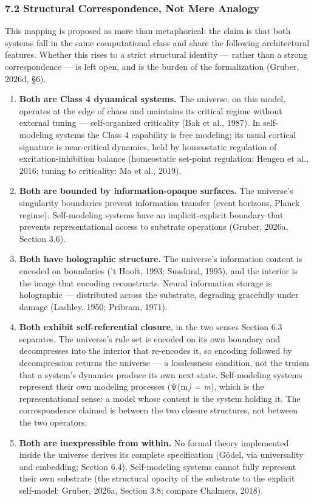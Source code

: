 \documentclass[
]{article}
\begin{document}
\hypertarget{structural-correspondence-not-mere-analogy}{%
\subsubsection{7.2 Structural Correspondence, Not Mere
Analogy}\label{structural-correspondence-not-mere-analogy}}

This mapping is proposed as more than metaphorical: the claim is that
both systems fall in the same computational class and share the
following architectural features. Whether this rises to a strict
structural identity --- rather than a strong correspondence --- is left
open, and is the burden of the formalization (Gruber, 2026d, §6).

\begin{enumerate}
\def\labelenumi{\arabic{enumi}.}
\item
  \textbf{Both are Class 4 dynamical systems.} The universe, on this
  model, operates at the edge of chaos and maintains its critical regime
  without external tuning --- self-organized criticality (Bak et al.,
  1987). In self-modeling systems the Class 4 capability is free
  modeling; its usual cortical signature is near-critical dynamics, held
  by homeostatic regulation of excitation-inhibition balance
  (homeostatic set-point regulation: Hengen et al., 2016; tuning to
  criticality: Ma et al., 2019).
\item
  \textbf{Both are bounded by information-opaque surfaces.} The
  universe's singularity boundaries prevent information transfer (event
  horizons, Planck regime). Self-modeling systems have an
  implicit-explicit boundary that prevents representational access to
  substrate operations (Gruber, 2026a, Section 3.6).
\item
  \textbf{Both have holographic structure.} The universe's information
  content is encoded on boundaries ('t Hooft, 1993; Susskind, 1995), and
  the interior is the image that encoding reconstructs. Neural
  information storage is holographic --- distributed across the
  substrate, degrading gracefully under damage (Lashley, 1950; Pribram,
  1971).
\item
  \textbf{Both exhibit self-referential closure}, in the two senses
  Section 6.3 separates. The universe's rule set is encoded on its own
  boundary and decompresses into the interior that re-encodes it, so
  encoding followed by decompression returns the universe --- a
  losslessness condition, not the truism that a system's dynamics
  produce its own next state. Self-modeling systems represent their own
  modeling processes (Ψ(m\emph{) = m}), which is the representational
  sense: a model whose content is the system holding it. The
  correspondence claimed is between the two closure structures, not
  between the two operators.
\item
  \textbf{Both are inexpressible from within.} No formal theory
  implemented inside the universe derives its complete specification
  (Gödel, via universality and embedding; Section 6.4). Self-modeling
  systems cannot fully represent their own substrate (the structural
  opacity of the substrate to the explicit self-model; Gruber, 2026a,
  Section 3.8; compare Chalmers, 2018).
\end{enumerate}
\end{document}
